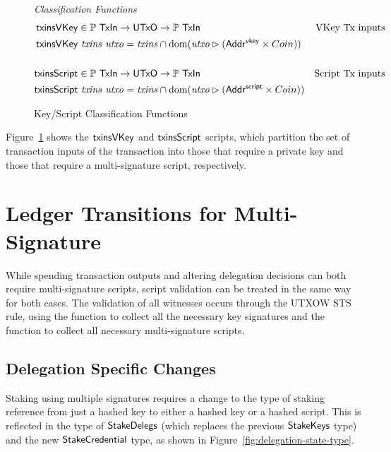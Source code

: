 \documentclass[11pt,a4paper,dvipsnames,twosided]{article}
\newcommand{\AddrVKey}{\type{Addr^{vkey}}}
\newcommand{\UTxO}{\type{UTxO}}
\newcommand{\StakeDelegs}{\type{StakeDelegs}}
\newcommand{\StakeObject}{\type{StakeCredential}}
\newcommand{\AddrScr}{\type{Addr^{script}}}
\newcommand{\TxIn}{\type{TxIn}}
\theoremstyle{definition}
\begin{document}
\begin{figure}[htb]
  \emph{Classification Functions}
  \begin{align*}
    \fun{txinsVKey} & \in \powerset \TxIn \to \UTxO \to \powerset\TxIn & \text{VKey Tx inputs}\\
    \fun{txinsVKey} & ~\var{txins}~\var{utxo} =
    \var{txins} \cap \dom (\var{utxo} \restrictrange (\AddrVKey \times Coin))
    \\
    \\
    \fun{txinsScript} & \in \powerset \TxIn \to \UTxO \to \powerset\TxIn & \text{Script Tx inputs}\\
    \fun{txinsScript} & ~\var{txins}~\var{utxo} =
                        \var{txins} \cap \dom (\var{utxo} \restrictrange (\AddrScr \times Coin))
  \end{align*}
  \caption{Key/Script Classification Functions}
  \label{fig:defs:functions-txins}
\end{figure}

Figure~\ref{fig:defs:functions-txins} shows the $\mathsf{txinsVKey}$ and
$\mathsf{txinsScript}$ scripts, which partition the set of transaction inputs of
the transaction into those that require a private key and those that require a
multi-signature script, respectively.

\section{Ledger Transitions for Multi-Signature}
\label{sec:ledg-trans-multi}

While spending transaction outputs and altering delegation decisions can both
require multi-signature scripts, script validation can be treated in the same
way for both cases. The validation of all witnesses occurs through the UTXOW STS
rule, using the  function to collect all the necessary key
signatures and the  function to collect all necessary
multi-signature scripts.

\subsection{Delegation Specific Changes}
\label{sec:deleg-trans-rules}

Staking using multiple signatures requires a change to the type of staking reference from
just a hashed key to either a hashed key or a hashed script. This is
reflected in the type of $\StakeDelegs$ (which replaces the previous
$\mathsf{StakeKeys}$ type) and the new $\StakeObject$ type, %
as shown in
Figure~\ref{fig:delegation-state-type}.
\end{document}
